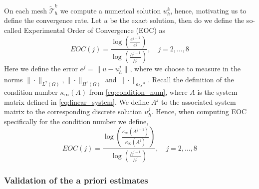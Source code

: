 \documentclass[11pt]{article}
\theoremstyle{remark}
\numberwithin{equation}{section}
\begin{document}
On each mesh $\widetilde{\mathcal{T}}^{k}_{h}  $ we compute a numerical solution $u_{h}^{k}$, hence, motivating us to define the convergence rate. Let $u $ be the exact solution, then do we define the so-called Experimental Order of Convergence (EOC) as
\begin{equation}
EOC( j) =  \frac{\log \left(  \frac{e^{j-1}}{e^{j}} \right)}{\log \left(  \frac{h^{j-1}}{h^{j}} \right)}, \quad    j = 2,\ldots, 8
\end{equation}
Here we define the error $e^{j} = \| u - u_{h}^{j} \|_{  }^{  } $, where we choose to measure in the norms $ \|\cdot   \|_{L^2( \Omega )   }^{  },   \|\cdot   \|_{H^1( \Omega )   }^{  } $ and $ \|\cdot   \|_{ a_{h},* }^{  }$.
Recall the definition of the condition number $\kappa_{\infty} ( A)$ from \eqref{eq:condition_num}, where $A$ is the system matrix defined in \eqref{eq:linear_system}. We define $A^{j}$ to the associated system matrix to the corresponding discrete solution
$u_{h}^{j}$. Hence, when computing EOC specifically for the condition number we define,
\begin{equation}
EOC( j) =  \frac{\log \left(  \frac{\kappa _{\infty}( A^{j-1})}{\kappa _{\infty}( A^{j})} \right)}{\log \left(  \frac{h^{j-1}}{h^{j}} \right)}, \quad    j = 2,\ldots, 8
\end{equation}


\subsubsection{Validation of the a priori estimates }%
\label{ssub:numerical_results}
\end{document}
